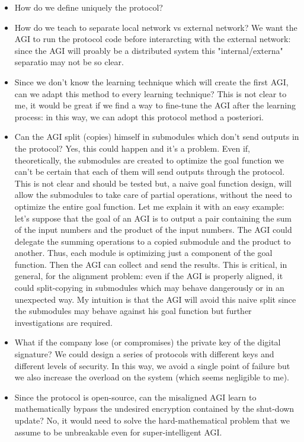 \documentclass{article}
\begin{document}
\begin{itemize}
    \item How do we define uniquely the protocol? 
    \item How do we teach to separate local network vs external network? 
    We want the AGI to run the protocol code before interarcting with the external network: since the AGI will proably be a distributed system this "internal/externa" separatio may not be so clear.
    \item Since we don't know the learning technique which will create the first AGI, can we adapt this method to every learning technique? 
    This is not clear to me, it would be great if we find a way to fine-tune the AGI after the learning process: in this way, we can adopt this protocol method a posteriori. 

    \item Can the AGI split (copies) himself in submodules which don't send outputs in the protocol? Yes, this could happen and it's a problem. Even if, theoretically, the submodules are created to optimize the goal function we can't be certain that each of them will send outputs through the protocol. 
    This is not clear and should be tested but, a naive goal function design, will allow the submodules to take care of partial operations, without the need to optimize the entire goal function. 
    Let me explain it with an easy example: let's suppose that the goal of an AGI is to output a pair containing the sum of the input numbers and the product of the input numbers. The AGI could delegate the summing operations to a copied submodule and the product to another. Thus, each module is optimizing just a component of the goal function. Then the AGI can collect and send the results.
    This is critical, in general, for the alignment problem: even if the AGI is properly aligned, it could split-copying in submodules which may behave dangerously or in an unexpected way.
    My intuition is that the AGI will avoid this naive split since the submodules may behave against his goal function but further investigations are required.

    \item What if the company lose (or compromises) the private key of the digital signature? We could design a series of protocols with different keys and different levels of security. 
    In this way, we avoid a single point of failure but we also increase the overload on the system (which seems negligible to me).
    
    \item Since the protocol is open-source, can the misaligned AGI learn to mathematically bypass the undesired encryption contained by the shut-down update?
     No, it would need to solve the hard-mathematical problem that we assume to be unbreakable even for super-intelligent AGI.
    
\end{itemize}
    
\end{document}
